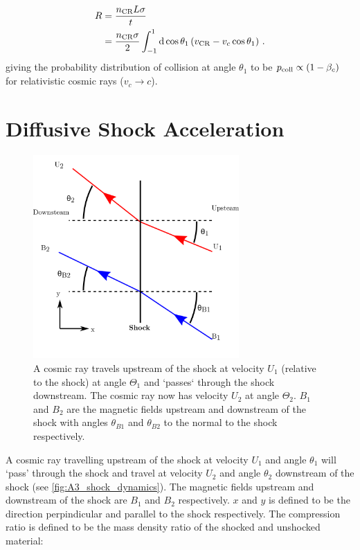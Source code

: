 \begin{equation}
    \begin{aligned}
        R&=\frac{n_\text{CR}L\sigma}{t} \\
        &=\frac{n_\text{CR}\sigma}{2}\int_{-1}^1\dd{\cos\theta_1}\qty(v_\text{CR}-v_c\cos\theta_1) \text{ .}
    \end{aligned}
\end{equation}
\noindent giving the probability distribution of collision at angle $\theta_1$ to be $p_\text{coll}\propto \qty(1-\beta_c)$ for relativistic cosmic rays ($v_c\rightarrow c$).

\section{Diffusive Shock Acceleration}

\begin{figure}
	\centering
	\includegraphics[width=0.7\textwidth]{A3_Diffusive_Shock_Acceleration/Images/shock_dynamics.png}
	\caption{A cosmic ray travels upstream of the shock at velocity $U_1$ (relative to the shock) at angle $\Theta_1$ and `passes` through the shock downstream. The cosmic ray now has velocity $U_2$ at angle $\Theta_2$. $B_1$ and $B_2$ are the magnetic fields upstream and downstream of the shock with angles $\theta_{B1}$ and $\theta_{B2}$ to the normal to the shock respectively.}
	\label{fig:A3_shock_dynamics}
\end{figure}

A cosmic ray travelling upstream of the shock at velocity $U_1$ and angle $\theta_1$ will `pass' through the shock and travel at velocity $U_2$ and angle $\theta_2$ downstream of the shock (see \autoref{fig:A3_shock_dynamics}). The magnetic fields upstream and downstream of the shock are $B_1$ and $B_2$ respectively.  $x$ and $y$ is defined to be the direction perpindicular and parallel to the shock respectively.
The compression ratio is defined to be the mass density ratio of the shocked and unshocked material:

